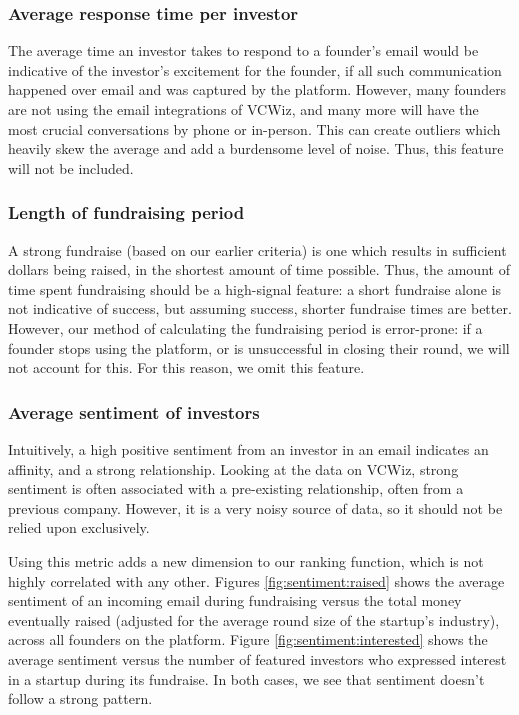 \subsubsection{Average response time per investor}

The average time an investor takes to respond to a founder's email would be indicative of the investor's excitement for the founder, if all such communication happened over email and was captured by the platform. However, many founders are not using the email integrations of VCWiz, and many more will have the most crucial conversations by phone or in-person. This can create outliers which heavily skew the average and add a burdensome level of noise. Thus, this feature will not be included.

\subsubsection{Length of fundraising period}

A strong fundraise (based on our earlier criteria) is one which results in sufficient dollars being raised, in the shortest amount of time possible. Thus, the amount of time spent fundraising should be a high-signal feature: a short fundraise alone is not indicative of success, but assuming success, shorter fundraise times are better. However, our method of calculating the fundraising period is error-prone: if a founder stops using the platform, or is unsuccessful in closing their round, we will not account for this. For this reason, we omit this feature.

\subsubsection{Average sentiment of investors}

Intuitively, a high positive sentiment from an investor in an email indicates an affinity, and a strong relationship. Looking at the data on VCWiz, strong sentiment is often associated with a pre-existing relationship, often from a previous company. However, it is a very noisy source of data, so it should not be relied upon exclusively.

Using this metric adds a new dimension to our ranking function, which is not highly correlated with any other. Figures \ref{fig:sentiment:raised} shows the average sentiment of an incoming email during fundraising versus the total money eventually raised (adjusted for the average round size of the startup's industry), across all founders on the platform. Figure \ref{fig:sentiment:interested} shows the average sentiment versus the number of featured investors who expressed interest in a startup during its fundraise. In both cases, we see that sentiment doesn't follow a strong pattern.

